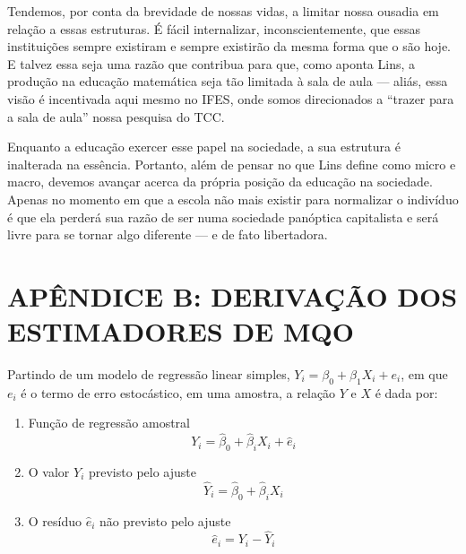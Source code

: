 \documentclass[
  12pt,
  letterpaper,
  DIV=11,
  numbers=noendperiod]{scrartcl}
\begin{document}
Tendemos, por conta da brevidade de nossas vidas, a limitar nossa
ousadia em relação a essas estruturas. É fácil internalizar,
inconscientemente, que essas instituições sempre existiram e sempre
existirão da mesma forma que o são hoje. E talvez essa seja uma razão
que contribua para que, como aponta Lins, a produção na educação
matemática seja tão limitada à sala de aula --- aliás, essa visão é
incentivada aqui mesmo no IFES, onde somos direcionados a ``trazer para
a sala de aula'' nossa pesquisa do TCC.

Enquanto a educação exercer esse papel na sociedade, a sua estrutura é
inalterada na essência. Portanto, além de pensar no que Lins define como
micro e macro, devemos avançar acerca da própria posição da educação na
sociedade. Apenas no momento em que a escola não mais existir para
normalizar o indivíduo é que ela perderá sua razão de ser numa sociedade
panóptica capitalista e será livre para se tornar algo diferente --- e
de fato libertadora.

\newpage

\hypertarget{apuxeandice-b-derivauxe7uxe3o-dos-estimadores-de-mqo}{%
\section{APÊNDICE B: DERIVAÇÃO DOS ESTIMADORES DE
MQO}\label{apuxeandice-b-derivauxe7uxe3o-dos-estimadores-de-mqo}}

Partindo de um modelo de regressão linear simples,
\(Y_i = \beta_0 + \beta_1X_i + e_i\), em que \(e_i\) é o termo de erro
estocástico, em uma amostra, a relação \(Y\) e \(X\) é dada por:

\begin{enumerate}
\def\labelenumi{\arabic{enumi}.}
\item
  Função de regressão amostral \begin{equation}
  Y_i = \hat{\beta}_0 + \hat{\beta}_iX_i + \hat{e}_i
  \end{equation}
\item
  O valor \(Y_i\) previsto pelo ajuste \begin{equation}
  \hat{Y}_i = \hat{\beta}_0 + \hat{\beta}_iX_i
  \end{equation}
\item
  O resíduo \(\hat{e}_i\) não previsto pelo ajuste \begin{equation}
  \hat{e}_i = Y_i - \hat{Y}_i
  \end{equation}
\end{enumerate}
\end{document}

